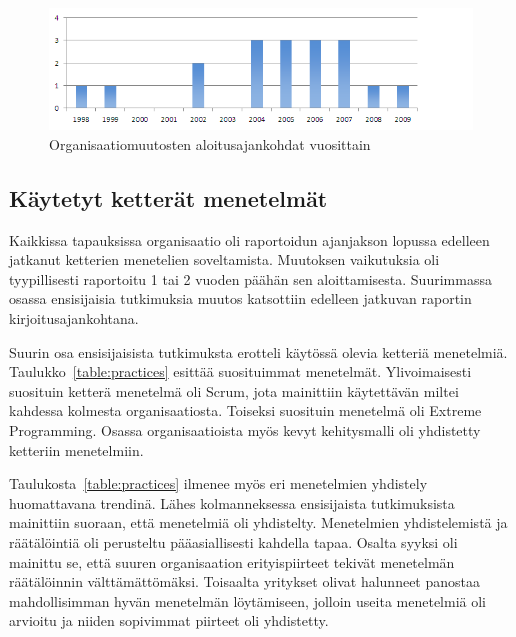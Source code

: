 \begin{figure}[htb]
  \begin{center}
    \includegraphics[width=1\textwidth]{img/Transformation_start}
    \caption{Organisaatiomuutosten aloitusajankohdat vuosittain}
    \label{fig:start_year}
  \end{center}
\end{figure}

\subsection{Käytetyt ketterät menetelmät}

Kaikkissa tapauksissa organisaatio oli raportoidun ajanjakson lopussa edelleen
jatkanut ketterien menetelien soveltamista. Muutoksen vaikutuksia oli
tyypillisesti raportoitu 1 tai 2 vuoden päähän sen aloittamisesta. Suurimmassa
osassa ensisijaisia tutkimuksia muutos katsottiin edelleen jatkuvan raportin
kirjoitusajankohtana.

Suurin osa ensisijaisista tutkimuksta erotteli käytössä olevia ketteriä
menetelmiä. Taulukko~\ref{table:practices} esittää suosituimmat menetelmät.
Ylivoimaisesti suosituin ketterä menetelmä oli Scrum, jota mainittiin
käytettävän miltei kahdessa kolmesta organisaatiosta. Toiseksi suosituin
menetelmä oli Extreme Programming. Osassa organisaatioista myös kevyt
kehitysmalli oli yhdistetty ketteriin menetelmiin.

Taulukosta~\ref{table:practices} ilmenee myös eri menetelmien yhdistely
huomattavana trendinä. Lähes kolmanneksessa ensisijaista tutkimuksista
mainittiin suoraan, että menetelmiä oli yhdistelty. Menetelmien yhdistelemistä
ja räätälöintiä oli perusteltu pääasiallisesti kahdella tapaa. Osalta syyksi oli
mainittu se, että suuren organisaation erityispiirteet tekivät menetelmän
räätälöinnin välttämättömäksi. Toisaalta yritykset olivat halunneet panostaa
mahdollisimman hyvän menetelmän löytämiseen, jolloin useita menetelmiä oli
arvioitu ja niiden sopivimmat piirteet oli yhdistetty.

